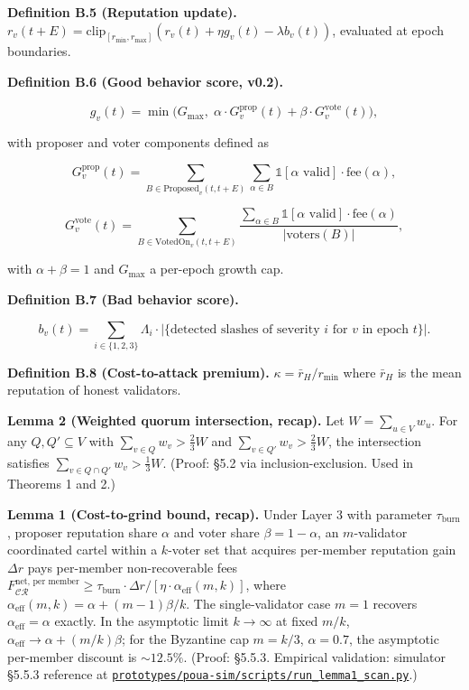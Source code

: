 \documentclass[
  11pt,
]{article}
\begin{document}
\textbf{Definition B.5 (Reputation update).}
\(r_v(t+E) = \text{clip}_{[r_{\min}, r_{\max}]}(r_v(t) + \eta g_v(t) - \lambda b_v(t))\),
evaluated at epoch boundaries.

\textbf{Definition B.6 (Good behavior score, v0.2).}

\[g_v(t) = \min\bigl(G_{\max},\; \alpha \cdot G_v^{\text{prop}}(t) + \beta \cdot G_v^{\text{vote}}(t)\bigr),\]

with proposer and voter components defined as

\[G_v^{\text{prop}}(t) = \sum_{B \in \text{Proposed}_v(t, t+E)} \sum_{\alpha \in B} \mathbb{1}[\alpha \text{ valid}] \cdot \text{fee}(\alpha),\]

\[G_v^{\text{vote}}(t) = \sum_{B \in \text{VotedOn}_v(t, t+E)} \frac{\sum_{\alpha \in B} \mathbb{1}[\alpha \text{ valid}] \cdot \text{fee}(\alpha)}{|\text{voters}(B)|},\]

with \(\alpha + \beta = 1\) and \(G_{\max}\) a per-epoch growth cap.

\textbf{Definition B.7 (Bad behavior score).}

\[b_v(t) = \sum_{i \in \{1,2,3\}} \Lambda_i \cdot |\{\text{detected slashes of severity } i \text{ for } v \text{ in epoch } t\}|.\]

\textbf{Definition B.8 (Cost-to-attack premium).}
\(\kappa = \bar{r}_H / r_{\min}\) where \(\bar{r}_H\) is the mean
reputation of honest validators.

\textbf{Lemma 2 (Weighted quorum intersection, recap).} Let
\(W = \sum_{u \in V} w_u\). For any \(Q, Q' \subseteq V\) with
\(\sum_{v \in Q} w_v > \frac{2}{3} W\) and
\(\sum_{v \in Q'} w_v > \frac{2}{3} W\), the intersection satisfies
\(\sum_{v \in Q \cap Q'} w_v > \frac{1}{3} W\). (Proof: §5.2 via
inclusion-exclusion. Used in Theorems 1 and 2.)

\textbf{Lemma 1 (Cost-to-grind bound, recap).} Under Layer 3 with
parameter \(\tau_{\text{burn}}\), proposer reputation share \(\alpha\)
and voter share \(\beta = 1 - \alpha\), an \(m\)-validator coordinated
cartel within a \(k\)-voter set that acquires per-member reputation gain
\(\Delta r\) pays per-member non-recoverable fees
\(F_{\mathcal{CR}}^{\text{net, per member}} \geq \tau_{\text{burn}} \cdot \Delta r / [\eta \cdot \alpha_{\text{eff}}(m, k)]\),
where \(\alpha_{\text{eff}}(m, k) = \alpha + (m - 1)\beta/k\). The
single-validator case \(m = 1\) recovers
\(\alpha_{\text{eff}} = \alpha\) exactly. In the asymptotic limit
\(k \to \infty\) at fixed \(m / k\),
\(\alpha_{\text{eff}} \to \alpha + (m / k)\beta\); for the Byzantine cap
\(m = k/3\), \(\alpha = 0.7\), the asymptotic per-member discount is
\(\sim 12.5\%\). (Proof: §5.5.3. Empirical validation: simulator §5.5.3
reference at
\href{https://github.com/ligate-io/ligate-research/tree/main/prototypes/poua-sim/scripts/run_lemma1_scan.py}{\texttt{prototypes/poua-sim/scripts/run\_lemma1\_scan.py}}.)
\end{document}
